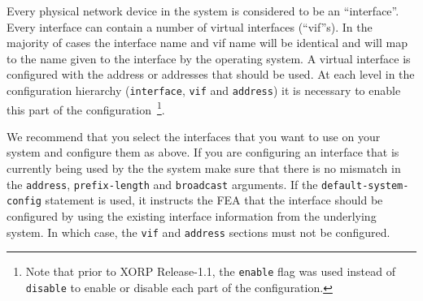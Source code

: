 \documentclass[11pt]{article}
\begin{document}
Every physical network device in the system is considered to be an
``interface''. Every interface can contain a number of virtual
interfaces (``vif''s). In the majority of cases the interface name and
vif name will be identical and will map to the name given to the
interface by the operating system. A virtual interface is configured
with the address or addresses that should be used. At each level in
the configuration hierarchy ({\tt interface}, {\tt vif} and
{\tt address}) it is necessary to enable this part of the
configuration~\footnote{Note that prior to XORP Release-1.1,
the {\tt enable} flag was used instead of {\tt disable} to enable
or disable each part of the configuration.}.

\vspace{0.1in}
\noindent{}
\vspace{0.1in}

We recommend that you select the interfaces that you want to use on
your system and configure them as above. If you are configuring an
interface that is currently being used by the the system make sure
that there is no mismatch in the {\tt address}, {\tt prefix-length} and
{\tt broadcast} arguments.
If the {\tt default-system-config} statement is used, it
instructs the FEA that the interface should be configured by using
the existing interface information from the underlying system.
In which case, the {\tt vif} and {\tt address} sections must not be
configured.
\end{document}
